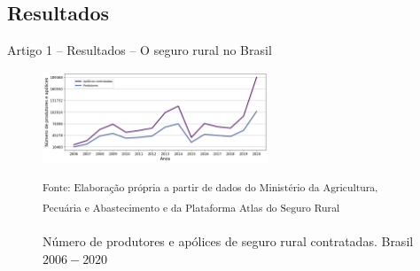 \documentclass[aspectratio=169]{beamer}
\begin{document}

\subsection{Resultados}

\begin{frame}{Artigo 1 -- Resultados -- O seguro rural no Brasil}
	\begin{figure}
		\centering
		\includegraphics[width=0.6\textwidth]{img/apolices_produtores.png}
		\caption{Número de produtores e apólices de seguro rural contratadas. Brasil $2006 - 2020$}
		\small \textsuperscript {Fonte: Elaboração própria a partir de dados do Ministério da Agricultura, Pecuária e Abastecimento e da Plataforma Atlas do Seguro Rural}
	\end{figure}
\end{frame}
\end{document}

